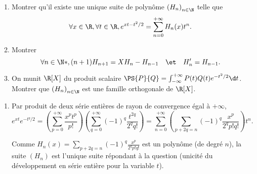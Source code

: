 \begin{enonce}
\begin{exercise}[ID={RMS133 E695},subtitle={Mines-Ponts PSI 2022},tags={},difficulty={}]
\begin{enumerate}
  \item Montrer qu'il existe une unique suite de polynôme $\left( H_n \right)_{n\in\N}$ telle que
    \begin{equation*}
      \forall x\in\R, \forall t\in\R, e^{xt-t^2/2} = \sum_{n=0}^{+\infty} H_n(x) t^n.
    \end{equation*}
  \item Montrer
    \begin{equation*}
      \forall n\in\N*, (n+1) H_{n+1} = X H_n - H_{n-1} \quad\et\quad H_n' = H_{n-1}.
    \end{equation*}

  \item On munit $\R[X]$ du produit scalaire $\PS{P}{Q}=\int_{-\infty}^{+\infty} P(t)Q(t) e^{-t^2/2} \d t$.
    Montrer que $\left( H_n \right)_{n\in\N}$ est une famille orthogonale de $\R[X]$.
\end{enumerate}
\end{exercise}
\begin{solution}
  \begin{enumerate}
    \item Par produit de deux série entières de rayon de convergence égal à $+\infty$,
      \begin{equation*}
        e^{xt} e^{-t²/2} 
        = \left( \sum_{p=0}^{+\infty} \frac{x^p t^p}{p!} \right) \left( \sum_{q=0}^{+\infty} (-1)^q \frac{t^{2q}}{2^q q!} \right)
        = \sum_{n=0}^{+\infty} \left( \sum_{p+2q=n} (-1)^q\frac{x^p}{2^q p! q!} \right) t^n.
      \end{equation*}

      Comme $H_n(x)=\sum_{p+2q=n} (-1)^q\frac{x^p}{2^q p! q!}$ est un polynôme (de degré $n$), la suite $(H_n)$ est l'unique suite répondant à la question (unicité du développement en série entière pour la variable $t$).



\end{enumerate}
\end{solution}
\end{enonce}

